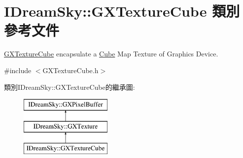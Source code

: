 \hypertarget{class_i_dream_sky_1_1_g_x_texture_cube}{}\section{I\+Dream\+Sky\+:\+:G\+X\+Texture\+Cube 類別 參考文件}
\label{class_i_dream_sky_1_1_g_x_texture_cube}


\hyperlink{class_i_dream_sky_1_1_g_x_texture_cube}{G\+X\+Texture\+Cube} encapsulate a \hyperlink{class_i_dream_sky_1_1_cube}{Cube} Map Texture of Graphics Device.  




{\ttfamily \#include $<$G\+X\+Texture\+Cube.\+h$>$}

類別\+I\+Dream\+Sky\+:\+:G\+X\+Texture\+Cube的繼承圖\+:\begin{figure}[H]
\begin{center}
\leavevmode
\includegraphics[height=3.000000cm]{class_i_dream_sky_1_1_g_x_texture_cube}
\end{center}
\end{figure}
